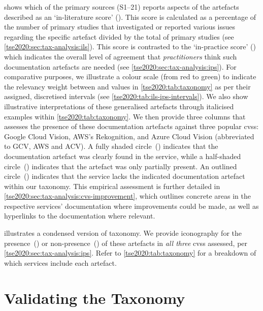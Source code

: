  shows which of the primary sources (S1--21) reports aspects of the artefacts described as an `in-literature score' (). This score is calculated as a percentage of the number of primary studies that investigated or reported various issues regarding the specific artefact divided by the total of primary studies (see \cref{tse2020:sec:tax-analysis:ils}). This score is contrasted to the `in-practice score' () which indicates the overall level of agreement that \textit{practitioners} think such documentation artefacts are needed (see \cref{tse2020:sec:tax-analysis:ips}).
For comparative purposes, we illustrate a colour scale (from red to green) to indicate the relevancy weight between  and  values in \cref{tse2020:tab:taxonomy} as per their assigned, discretised intervals (see \cref{tse2020:tab:ils-ips-intervals}). We also show illustrative interpretations of these generalised artefacts through italicised examples within \cref{tse2020:tab:taxonomy}.
We then provide three columns that assesses the presence of these documentation artefacts against three popular \glspl{cvs}: Google Cloud Vision, AWS's Rekognition, and Azure Cloud Vision (abbreviated to GCV, AWS and ACV). A fully shaded circle~(\circlepresent{}) indicates that the documentation artefact was clearly found in the service, while a half-shaded circle~(\circlepartialpresent{}) indicates that the artefact was only partially present. An outlined circle~(\circlenotpresent{}) indicates that the service lacks the indicated documentation artefact within our taxonomy. This empirical assessment is further detailed in \cref{tse2020:sec:tax-analysis:cvs-improvement}, which outlines concrete areas in the respective services' documentation where improvements could be made, as well as hyperlinks to the documentation where relevant.

 illustrates a condensed version of taxonomy.
We provide iconography for the presence~(\faCheckCircle) or non-presence~(\faTimesCircle) of these artefacts in \textit{all three} \glspl{cvs} assessed, per \cref{tse2020:sec:tax-analysis:ips}. Refer to \cref{tse2020:tab:taxonomy} for a breakdown of which services include each artefact.



\section{Validating the Taxonomy}
\label{tse2020:sec:validation}

